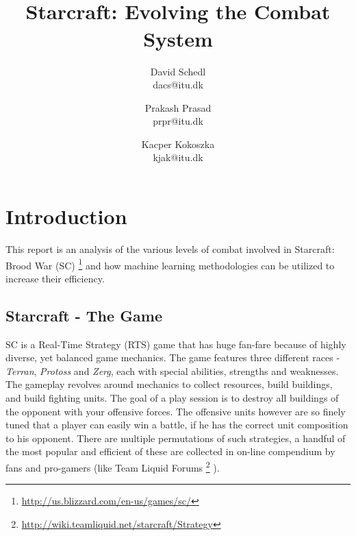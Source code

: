 \documentclass[conference]{IEEEtran}
\begin{document}
\title{\ \\ \LARGE\bf Starcraft: Evolving the Combat System}

\author{David Schedl \\ dacs@itu.dk \and Prakash Prasad \\ prpr@itu.dk \and Kacper Kokoszka \\ kjak@itu.dk }


\maketitle



\section{Introduction}
\label{sec:Intro}
This report is an analysis of the various levels of combat involved in Starcraft: Brood War (SC)%
\footnote{\url{http://us.blizzard.com/en-us/games/sc/}} %
and how machine learning methodologies can be utilized to increase their efficiency.
\subsection{Starcraft - The Game}
SC is a Real-Time Strategy (RTS) game that has huge fan-fare because of highly diverse, yet balanced game mechanics. The game features three different races - \emph{Terran}, \emph{Protoss} and \emph{Zerg}, each with special abilities, strengths and weaknesses. The gameplay revolves around mechanics to collect resources, build buildings, and build fighting units. The goal of a play session is to destroy all buildings of the opponent with your offensive forces. The offensive units however are so finely tuned that a player can easily win a battle, if he has the correct unit composition to his opponent. There are multiple permutations of such strategies, a handful of the most popular and efficient of these are collected in on-line compendium by fans and pro-gamers (like Team Liquid Forums%
\footnote{\url{http://wiki.teamliquid.net/starcraft/Strategy}}%
).
\end{document}
